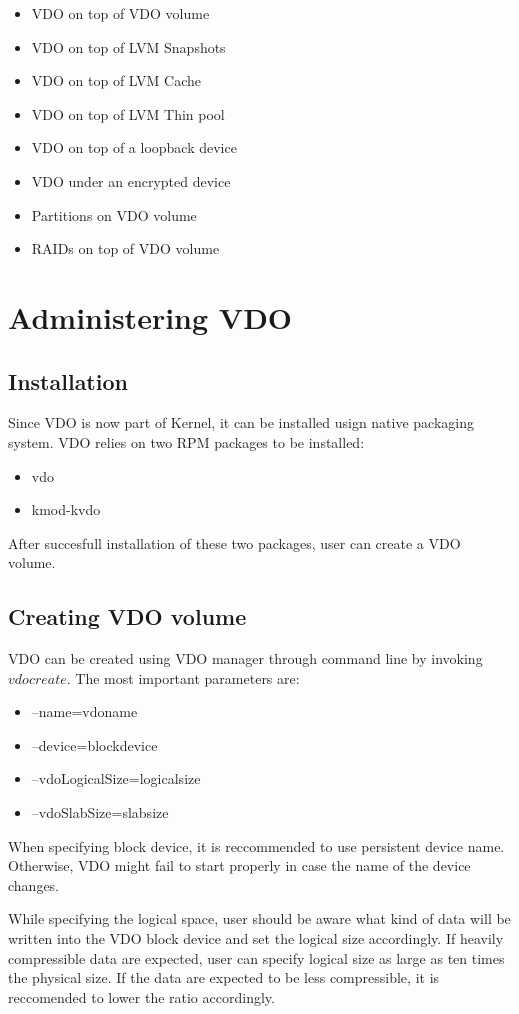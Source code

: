 \documentclass[
  color, %
  table, %
  lof,   %
  lot,   %
]{fithesis3}
\begin{document}
\begin{itemize}
  \item VDO on top of VDO volume
  \item VDO on top of LVM Snapshots
  \item VDO on top of LVM Cache
  \item VDO on top of LVM Thin pool
  \item VDO on top of a loopback device
  \item VDO under an encrypted device
  \item Partitions on VDO volume
  \item RAIDs on top of VDO volume          
\end{itemize}

\section{Administering VDO}
\subsection{Installation}
Since VDO is now part of Kernel, it can be installed usign native packaging system. VDO relies on two RPM packages to be installed:
\begin{itemize}
    \item vdo
    \item kmod-kvdo
\end{itemize}
After succesfull installation of these two packages, user can create a VDO volume.

\subsection{Creating VDO volume}
VDO can be created using VDO manager through command line by invoking $vdo create$.
The most important parameters are:
\begin{itemize}
    \item --name=vdoname
    \item --device=blockdevice
    \item --vdoLogicalSize=logicalsize
    \item --vdoSlabSize=slabsize
\end{itemize}

When specifying block device, it is reccommended to use persistent device name. Otherwise, VDO might fail to start properly in case the name of the device changes.

While specifying the logical space, user should be aware what kind of data will be written into the VDO block device and set the logical size accordingly. If heavily compressible data are expected, user can specify logical size as large as ten times the physical size. If the data are expected to be less compressible, it is reccomended to lower the ratio accordingly.
\end{document}
